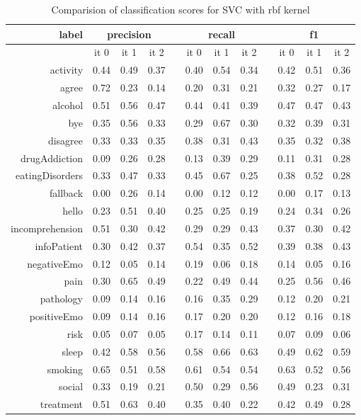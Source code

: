\documentclass[11pt]{article}
\begin{document}
\begin{table}[htb]
\begin{center}
\begin{tabular}{ |r|c|c|c|l|c|c|c|l|c|c|c| }
\hline
label 			& \multicolumn{3}{c|}{precision} && \multicolumn{3}{c|}{recall} && \multicolumn{3}{c|}{f1} \\ \hline 
				& it 0 &  it 1 & it 2 && it 0 & it 1 & it 2 && it 0 & it 1 & it 2\\ \hline 
activity 		& 0.44 &  0.49 & 0.37 && 0.40 & 0.54 & 0.34 && 0.42 & 0.51 & 0.36\\ \hline 
agree 			& 0.72 &  0.23 & 0.14 && 0.20 & 0.31 & 0.21 && 0.32 & 0.27 & 0.17\\ \hline 
alcohol 		& 0.51 &  0.56 & 0.47 && 0.44 & 0.41 & 0.39 && 0.47 & 0.47 & 0.43\\ \hline 
bye 			& 0.35 &  0.56 & 0.33 && 0.29 & 0.67 & 0.30 && 0.32 & 0.39 & 0.31\\ \hline 
disagree 		& 0.33 &  0.33 & 0.35 && 0.38 & 0.31 & 0.43 && 0.35 & 0.32 & 0.38\\ \hline 
drugAddiction 	& 0.09 &  0.26 & 0.28 && 0.13 & 0.39 & 0.29 && 0.11 & 0.31 & 0.28\\ \hline 
eatingDisorders & 0.33 &  0.47 & 0.33 && 0.45 & 0.67 & 0.25 && 0.38 & 0.52 & 0.28\\ \hline 
fallback 		& 0.00 &  0.26 & 0.14 && 0.00 & 0.12 & 0.12 && 0.00 & 0.17 & 0.13\\ \hline 
hello 			& 0.23 &  0.51 & 0.40 && 0.25 & 0.25 & 0.19 && 0.24 & 0.34 & 0.26\\ \hline 
incomprehension & 0.51 &  0.30 & 0.42 && 0.29 & 0.29 & 0.43 && 0.37 & 0.30 & 0.42\\ \hline 
infoPatient 	& 0.30 &  0.42 & 0.37 && 0.54 & 0.35 & 0.52 && 0.39 & 0.38 & 0.43\\ \hline 
negativeEmo 	& 0.12 &  0.05 & 0.14 && 0.19 & 0.06 & 0.18 && 0.14 & 0.05 & 0.16\\ \hline 
pain 			& 0.30 &  0.65 & 0.49 && 0.22 & 0.49 & 0.44 && 0.25 & 0.56 & 0.46\\ \hline 
pathology 		& 0.09 &  0.14 & 0.16 && 0.16 & 0.35 & 0.29 && 0.12 & 0.20 & 0.21\\ \hline 
positiveEmo 	& 0.09 &  0.14 & 0.16 && 0.17 & 0.20 & 0.20 && 0.12 & 0.16 & 0.18\\ \hline 
risk 			& 0.05 &  0.07 & 0.05 && 0.17 & 0.14 & 0.11 && 0.07 & 0.09 & 0.06\\ \hline 
sleep 			& 0.42 &  0.58 & 0.56 && 0.58 & 0.66 & 0.63 && 0.49 & 0.62 & 0.59\\ \hline 
smoking 		& 0.65 &  0.51 & 0.58 && 0.61 & 0.54 & 0.54 && 0.63 & 0.52 & 0.56\\ \hline 
social 			& 0.33 &  0.19 & 0.21 && 0.50 & 0.29 & 0.56 && 0.49 & 0.23 & 0.31\\ \hline 
treatment 		& 0.51 &  0.63 & 0.40 && 0.35 & 0.40 & 0.22 && 0.42 & 0.49 & 0.28\\ \hline 
\end{tabular}
\caption{Comparision of classification scores for SVC with rbf kernel}
\end{center}
\end{table}
\FloatBarrier
\end{document}
